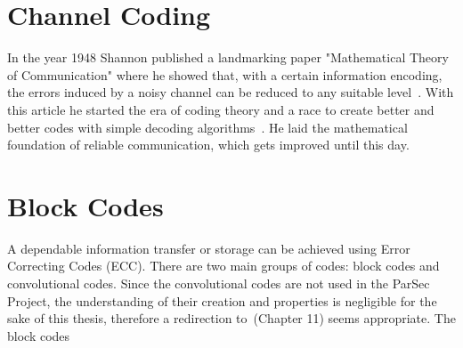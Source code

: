 \section{Channel Coding} \label{sec:cod}
In the year 1948 Shannon published a landmarking paper "Mathematical Theory of Communication" where he showed that, with a certain information encoding, the errors induced by a noisy channel can be reduced to any suitable level~\cite{art:Shannon}. With this article he started the era of coding theory and a race to create better and better codes with simple decoding algorithms~\cite{book:Lint}. He laid the mathematical foundation of reliable communication, which gets improved until this day.\\

\section{Block Codes}\label{sub:codered}
A dependable information transfer or storage can be achieved using Error Correcting Codes (ECC).
There are two main groups of codes: block codes and convolutional codes. Since the convolutional codes are not used in the ParSec Project, the understanding of their creation and properties is negligible for the sake of this thesis, therefore a redirection to~\cite{book:Lint}(Chapter 11) seems appropriate.
The block codes
